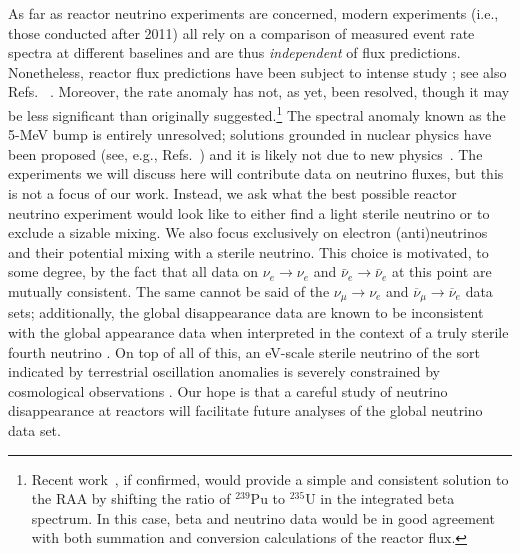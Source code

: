 \documentclass[prd, twocolumn, tightenlines, twoside, secnumarabic, superscriptaddress, preprintnumbers, nofootinbib, notitlepage]{revtex4-1}
\begin{document}
As far as reactor neutrino experiments are concerned, modern experiments (i.e., those conducted after 2011) \cite{NEOS:2016wee, DANSS:2018fnn, Serebrov:2020kmd, PROSPECT:2020sxr, STEREO:2020hup} all rely on a comparison of measured event rate spectra at different baselines and are thus \emph{independent} of flux predictions. Nonetheless, reactor flux predictions have been subject to intense study \cite{Hayes:2013wra,Hayen:2018uyg,Estienne:2019ujo,Hayen:2019eop}; see also Refs.~\cite{DayaBay:2017jkb, Giunti:2017nww, Giunti:2017yid, Gebre:2017vmm, Dentler:2017tkw, RENO:2018pwo, Giunti:2019qlt, Berryman:2019hme, Berryman:2020agd, Giunti:2021kab} . Moreover, the rate anomaly has not, as yet, been resolved, though it may be less significant than originally suggested.\footnote{Recent work~\cite{Kopeikin:2021ugh}, if confirmed, would provide a simple and consistent solution to the RAA by shifting the ratio of $^{239}$Pu to $^{235}$U in the integrated beta spectrum. In this case, beta and neutrino data would be in good agreement with both summation and conversion calculations of the reactor flux.} The spectral anomaly known as the 5-MeV bump \cite{DoubleChooz:2014kuw, DayaBay:2015lja, RENO:2015ksa, PROSPECT:2020sxr, STEREO:2020hup} is entirely unresolved; solutions grounded in nuclear physics have been proposed (see, e.g., Refs.~\cite{Hayes:2015yka, Sonzogni:2017wxy, Mention:2017dyq, Littlejohn:2018hqm, Hayen:2019eop}) and it is likely not due to new physics~\cite{Berryman:2018jxt}. The experiments we will discuss here will contribute data on neutrino fluxes, but this is not a focus of our work. Instead, we ask what the best possible reactor neutrino experiment would look like to either find a light sterile neutrino or to exclude a sizable mixing. We also focus exclusively on electron (anti)neutrinos and their potential mixing with a sterile neutrino. This choice is motivated, to some degree, by the fact that all data on $\nu_e\to \nu_e$ and $\bar\nu_e\to \bar\nu_e$ at this point are mutually consistent. The same cannot be said of the $\nu_\mu \to \nu_e$ and $\overline\nu_\mu \to \overline\nu_e$ data sets; additionally, the global disappearance data are known to be inconsistent with the global appearance data when interpreted in the context of a truly sterile fourth neutrino \cite{Dentler:2018sju, Boser:2019rta, Moulai:2019gpi, Adamson:2020jvo}. On top of all of this, an eV-scale sterile neutrino of the sort indicated by terrestrial oscillation anomalies is severely constrained by cosmological observations \cite{Berryman:2019nvr, Gariazzo:2019gyi, Hagstotz:2020ukm, Adams:2020nue}. Our hope is that a careful study of neutrino disappearance at reactors will facilitate future analyses of the global neutrino data set.
\end{document}
